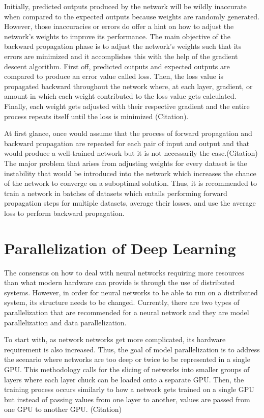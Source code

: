 \documentclass{IEEEtran}
\begin{document}
        Initially, predicted outputs produced by the network will be wildly inaccurate when compared to the expected outputs because weights are randomly generated. However, those inaccuracies or errors do offer a hint on how to adjust the network’s weights to improve its performance. The main objective of the backward propagation phase is to adjust the network’s weights such that its errors are minimized and it accomplishes this with the help of the gradient descent algorithm. First off, predicted outputs and expected outputs are compared to produce an error value called loss. Then, the loss value is propagated backward throughout the network where, at each layer, gradient, or amount in which each weight contributed to the loss value gets calculated. Finally, each weight gets adjusted with their respective gradient and the entire process repeats itself until the loss is minimized (Citation).

        At first glance, once would assume that the process of forward propagation and backward propagation are repeated for each pair of input and output and that would produce a well-trained network but it is not necessarily the case.(Citation) The major problem that arises from adjusting weights for every dataset is the instability that would be introduced into the network which increases the chance of the network to converge on a suboptimal solution. Thus, it is recommended to train a network in batches of datasets which entails performing forward propagation steps for multiple datasets, average their losses, and use the average loss to perform backward propagation. 

    \section{Parallelization of Deep Learning}
        The consensus on how to deal with neural networks requiring more resources than what modern hardware can provide is through the use of distributed systems. However, in order for neural networks to be able to run on a distributed system, its structure needs to be changed. Currently, there are two types of parallelization that are recommended for a neural network and they are model parallelization and data parallelization.

        To start with, as network networks get more complicated, its hardware requirement is also increased. Thus, the goal of model parallelization is to address the scenario where networks are too deep or twice to be represented in a single GPU. This methodology calls for the slicing of networks into smaller groups of layers where each layer chuck can be loaded onto a separate GPU. Then, the training process occurs similarly to how a network gets trained on a single GPU but instead of passing values from one layer to another, values are passed from one GPU to another GPU. (Citation)
\end{document}
